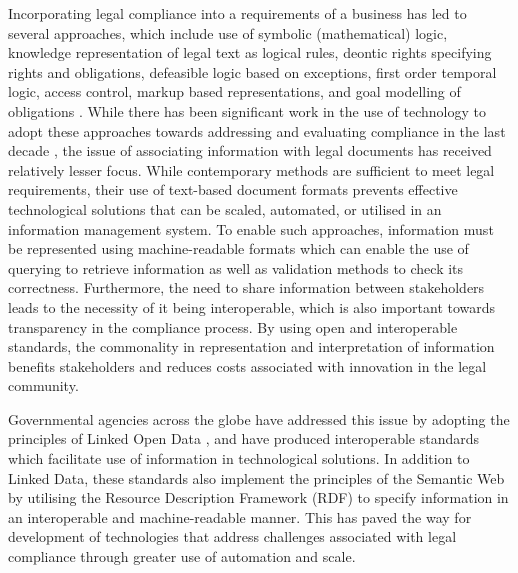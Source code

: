 Incorporating legal compliance into a requirements of a business has led to several approaches, which include use of symbolic (mathematical) logic, knowledge representation of legal text as logical rules, deontic rights specifying rights and obligations, defeasible logic based on exceptions, first order temporal logic, access control, markup based representations, and goal modelling of obligations \cite{otto_addressing_2007}.
While there has been significant work in the use of technology to adopt these approaches towards addressing and evaluating compliance in the last decade \cite{sadiq_modeling_2007,otto_addressing_2007,gordon_rules_2009,fellmann_state---art_2014,benyoucef_information_2015,elgammal_formalizing_2016,kirrane_access_2016}, the issue of associating information with legal documents has received relatively lesser focus.
While contemporary methods are sufficient to meet legal requirements, their use of text-based document formats prevents effective technological solutions that can be scaled, automated, or utilised in an information management system. To enable such approaches, information must be represented using machine-readable formats which can enable the use of querying to retrieve information as well as validation methods to check its correctness. Furthermore, the need to share information between stakeholders leads to the necessity of it being interoperable, which is also important towards transparency in the compliance process. By using open and interoperable standards, the commonality in representation and interpretation of information benefits stakeholders and reduces costs associated with innovation in the legal community.

Governmental agencies across the globe have addressed this issue by adopting the principles of Linked Open Data \cite{bizer_linked_2011}, and have produced interoperable standards \cite{palmirani_akoma_2018,european_union_eli_2015,van_opijnen_european_2011} which facilitate use of information in technological solutions.
In addition to Linked Data, these standards also implement the principles of the Semantic Web \cite{noauthor_semantic_nodate} by utilising the Resource Description Framework (RDF) \cite{noauthor_rdf_2014} to specify information in an interoperable and machine-readable manner.
This has paved the way for development of technologies that address challenges associated with legal compliance through greater use of automation and scale.

